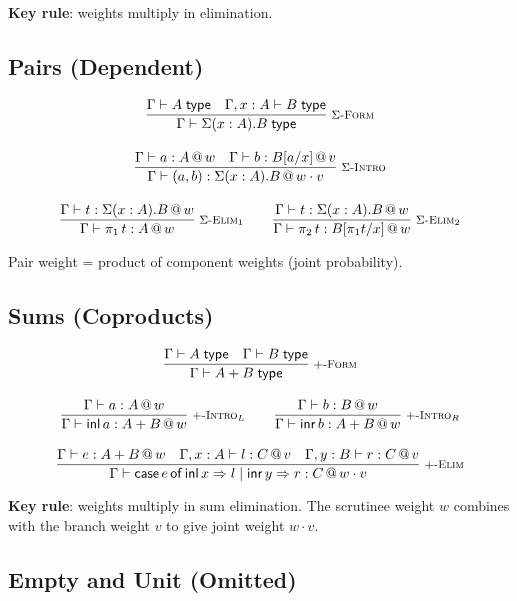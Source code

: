 \documentclass[11pt,a4paper]{article}
\makeatletter
\newcommand{\infer}[3][]{%
  \genfrac{}{}{0.4pt}{0}{#3}{#2}\;\textsc{\footnotesize #1}%
}
\newcommand{\type}{\;\mathsf{type}}
\newcommand{\at}[1]{\,@\,#1}
\makeatother
\begin{document}
\textbf{Key rule}: weights multiply in elimination.

\subsection{Pairs (Dependent)}

\begin{gather}
\infer[\textsc{$\Sigma$-Form}]
  {\Gamma \vdash \Sigma(x : A). B \type}
  {\Gamma \vdash A \type \quad \Gamma, x : A \vdash B \type}
\\[1em]
\infer[\textsc{$\Sigma$-Intro}]
  {\Gamma \vdash (a, b) : \Sigma(x : A). B \at{w \cdot v}}
  {\Gamma \vdash a : A \at{w} \quad \Gamma \vdash b : B[a/x] \at{v}}
\\[1em]
\infer[\textsc{$\Sigma$-Elim$_1$}]
  {\Gamma \vdash \pi_1\,t : A \at{w}}
  {\Gamma \vdash t : \Sigma(x : A). B \at{w}}
\qquad
\infer[\textsc{$\Sigma$-Elim$_2$}]
  {\Gamma \vdash \pi_2\,t : B[\pi_1 t / x] \at{w}}
  {\Gamma \vdash t : \Sigma(x : A). B \at{w}}
\end{gather}

Pair weight = product of component weights (joint probability).

\subsection{Sums (Coproducts)}

\begin{gather}
\infer[\textsc{$+$-Form}]
  {\Gamma \vdash A + B \type}
  {\Gamma \vdash A \type \quad \Gamma \vdash B \type}
\\[1em]
\infer[\textsc{$+$-Intro$_L$}]
  {\Gamma \vdash \mathsf{inl}\,a : A + B \at{w}}
  {\Gamma \vdash a : A \at{w}}
\qquad
\infer[\textsc{$+$-Intro$_R$}]
  {\Gamma \vdash \mathsf{inr}\,b : A + B \at{w}}
  {\Gamma \vdash b : B \at{w}}
\\[1em]
\infer[\textsc{$+$-Elim}]
  {\Gamma \vdash \mathsf{case}\,e\,\mathsf{of}\,\mathsf{inl}\,x \Rightarrow l \mid \mathsf{inr}\,y \Rightarrow r : C \at{w \cdot v}}
  {\Gamma \vdash e : A + B \at{w} \quad \Gamma, x : A \vdash l : C \at{v} \quad \Gamma, y : B \vdash r : C \at{v}}
\end{gather}

\textbf{Key rule}: weights multiply in sum elimination. The scrutinee weight $w$ combines with the branch weight $v$ to give joint weight $w \cdot v$.

\subsection{Empty and Unit (Omitted)}
\end{document}
